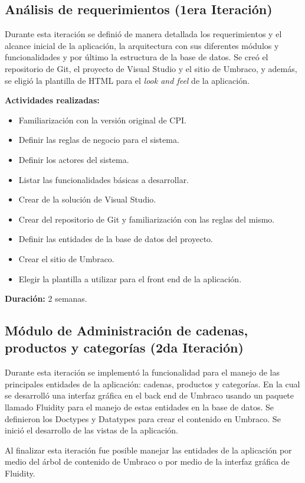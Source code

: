 \subsection{Análisis de requerimientos (1era Iteración)}
Durante esta iteración se definió de manera detallada los requerimientos y el alcance inicial de la aplicación, la arquitectura con sus diferentes módulos y funcionalidades y por último la estructura de la base de datos. Se creó el repositorio de Git, el proyecto de Visual Studio y el sitio de Umbraco, y además, se eligió la plantilla de HTML para el \emph{look and feel} de la aplicación.

\textbf{Actividades realizadas:}
\begin{itemize}
   \item Familiarización con la versión original de CPI.
   \item Definir las reglas de negocio para el sistema.
   \item Definir los actores del sistema.
   \item Listar las funcionalidades básicas a desarrollar.
   \item Crear de la solución de Visual Studio.
   \item Crear del repositorio de Git y familiarización con las reglas del mismo.
   \item Definir las entidades de la base de datos del proyecto.
   \item Crear el sitio de Umbraco.
   \item Elegir la plantilla a utilizar para el front end de la aplicación.
\end{itemize}

\textbf{Duración:} 2 semanas.

\subsection{Módulo de Administración de cadenas, productos y categorías (2da Iteración)}
Durante esta iteración se implementó la funcionalidad para el manejo de las principales entidades de la aplicación: cadenas, productos y categorías. En la cual se desarrolló una interfaz gráfica en el back end de Umbraco usando un paquete llamado Fluidity para el manejo de estas entidades en la base de datos. Se definieron los Doctypes y Datatypes para crear el contenido en Umbraco. Se inició el desarrollo de las vistas de la aplicación.

Al finalizar esta iteración fue posible manejar las entidades de la aplicación por medio del árbol de contenido de Umbraco o por medio de la interfaz gráfica de Fluidity. 

